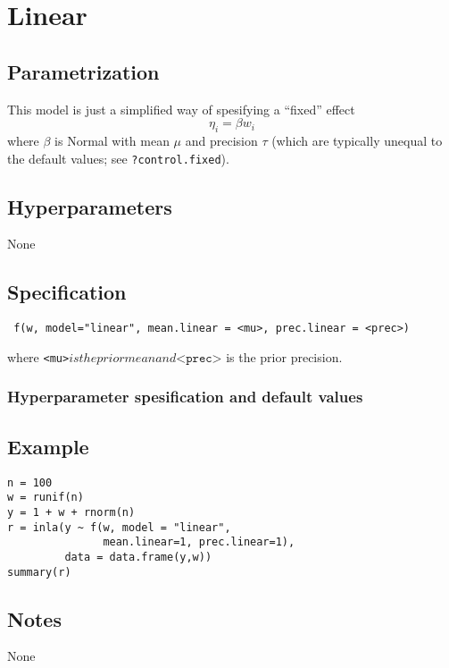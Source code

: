\documentclass[a4paper,11pt]{article}
\begin{document}
\section*{Linear}

\subsection*{Parametrization}

This model is just a simplified way of spesifying a ``fixed'' effect
\begin{displaymath}
    \eta_{i} = \beta w_{i}
\end{displaymath}
where $\beta$ is Normal with mean $\mu$ and precision $\tau$ (which
are typically unequal to the default values; see
\texttt{?control.fixed}).

\subsection*{Hyperparameters}

None

\subsection*{Specification}

\begin{verbatim}
 f(w, model="linear", mean.linear = <mu>, prec.linear = <prec>)
\end{verbatim}
where \texttt{<mu>}$ is the prior mean and
\texttt{<prec>}$ is the prior precision.


\subsubsection*{Hyperparameter spesification and default values}


\subsection*{Example}

\begin{verbatim}
n = 100
w = runif(n)
y = 1 + w + rnorm(n)
r = inla(y ~ f(w, model = "linear",
               mean.linear=1, prec.linear=1),
         data = data.frame(y,w))
summary(r)
\end{verbatim}


\subsection*{Notes}
None
\end{document}
